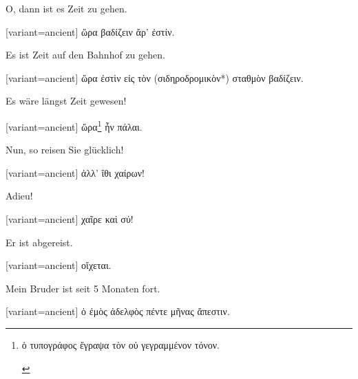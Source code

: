 O, dann ist es Zeit zu gehen.

\switchcolumn

\begin{greek}[variant=ancient]%
ὥρα βαδίζειν ἄρ' ἐστίν.

\end{greek}%
\switchcolumn*

Es ist Zeit auf den Bahnhof zu gehen.

\switchcolumn

\begin{greek}[variant=ancient]%
ὥρα ἐστὶν εἰς τὸν (σιδηροδρομικὸν{*}) σταθμὸν βαδίζειν.

\end{greek}%
\switchcolumn*

Es wäre längst Zeit gewesen!

\switchcolumn

\begin{greek}[variant=ancient]%
ὥρα\footnote{\begin{latin}%
\textgreek[variant=ancient]{ὁ τυπογράφος ἔγραψα τὸν οὐ γεγραμμένον
τόνον.}\end{latin}%
} ἦν πάλαι.

\end{greek}%
\switchcolumn*

Nun, so reisen Sie glücklich!

\switchcolumn

\begin{greek}[variant=ancient]%
ἀλλ' ἴθι χαίρων!

\end{greek}%
\switchcolumn*

Adieu!

\switchcolumn

\begin{greek}[variant=ancient]%
χαῖρε καὶ σύ!

\end{greek}%
\switchcolumn*

Er ist abgereist.

\switchcolumn

\begin{greek}[variant=ancient]%
οἴχεται.

\end{greek}%
\switchcolumn*

Mein Bruder ist seit 5 Monaten fort.

\switchcolumn

\begin{greek}[variant=ancient]%
ὁ ἐμὸς ἀδελφὸς πέντε μῆνας ἄπεστιν.

\end{greek}%
\switchcolumn*

